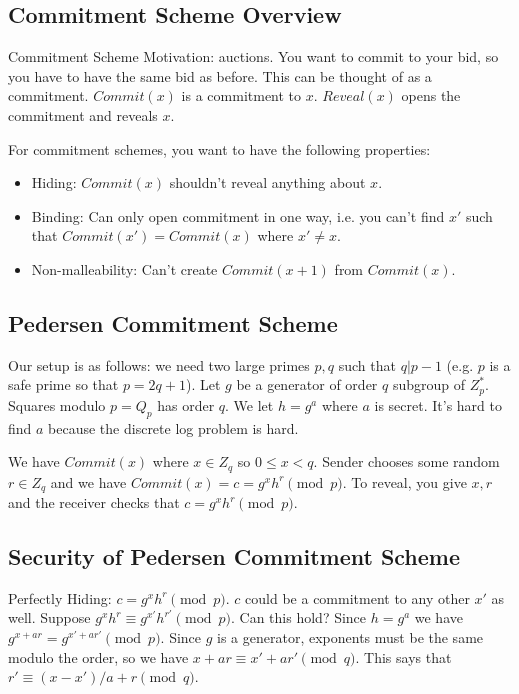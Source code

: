 \documentclass[psamsfonts]{amsart}
\begin{document}
\subsection{Commitment Scheme Overview}

Commitment Scheme Motivation: auctions. You want to commit to your bid, so you have to have the same bid as before. This can be thought of as a commitment. $Commit(x)$ is a commitment to $x$. $Reveal(x)$ opens the commitment and reveals $x$.

For commitment schemes, you want to have the following properties:
\begin{itemize}
  \item Hiding: $Commit(x)$ shouldn't reveal anything about $x$.
  \item Binding: Can only open commitment in one way, i.e. you can't find $x'$ such that $Commit(x') = Commit(x)$ where $x' \neq x$.
  \item Non-malleability: Can't create $Commit(x+1)$ from $Commit(x)$.
\end{itemize}

\subsection{Pedersen Commitment Scheme}

Our setup is as follows: we need two large primes $p,q$ such that $q | p-1$ (e.g. $p$ is a safe prime so that $p = 2q + 1$). Let $g$ be a generator of order $q$ subgroup of $Z_p^*$. Squares modulo $p = Q_p$ has order $q$. We let $h = g^a$ where $a$ is secret. It's hard to find $a$ because the discrete log problem is hard.

We have $Commit(x)$ where $x \in Z_q$ so $0 \leq x < q$. Sender chooses some random $r \in Z_q$ and we have $Commit(x) = c = g^x h^r \pmod{p}$. To reveal, you give $x,r$ and the receiver checks that $c = g^x h^r \pmod{p}$.

\subsection{Security of Pedersen Commitment Scheme}

Perfectly Hiding: $c = g^x h^r \pmod{p}$. $c$ could be a commitment to any other $x'$ as well. Suppose $g^x h^r \equiv g^{x'} h^{r'} \pmod{p}$. Can this hold? Since $h = g^a$ we have $g^{x + ar} = g^{x' + ar'} \pmod{p}$. Since $g$ is a generator, exponents must be the same modulo the order, so we have $x+ar \equiv x' + ar' \pmod{q}$. This says that $r' \equiv (x - x')/a + r \pmod{q}$.
\end{document}
